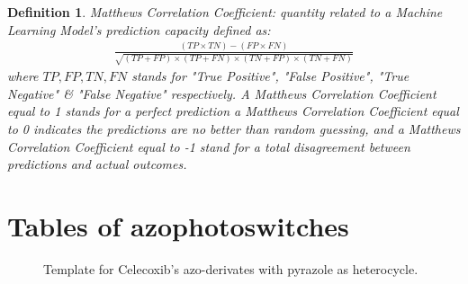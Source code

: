\documentclass[11pt]{article}
\newtheorem{definition}{Definition}
\begin{document}
\begin{definition}\label{definitionMatthewsCorrelationCoeficient}
Matthews Correlation Coefficient: quantity related to a Machine Learning Model's prediction capacity defined as:
{\scriptsize
\begin{align}
\frac{(TP\times TN)-(FP\times FN)}{\sqrt{(TP+FP)\times(TP+FN)\times(TN+FP)\times(TN+FN)}}
\end{align}
}where $TP,FP,TN,FN$ stands for "True Positive", "False Positive", "True Negative" \& "False Negative" respectively.
A Matthews Correlation Coefficient equal to 1 stands for a perfect prediction a Matthews Correlation Coefficient equal to 0 indicates the predictions are no better than random guessing, and a Matthews Correlation Coefficient equal to -1 stand for a total disagreement between predictions and actual outcomes.
\end{definition}


\section{Tables of azophotoswitches}\label{appendixAzophotoshiches}
\begin{figure}[H]
\captionsetup{type=scheme}
\centering
{}
\caption{Template for Celecoxib's azo-derivates with pyrazole as heterocycle.}
\label{figureCelecoxibPyrazole}
\end{figure}
\end{document}
